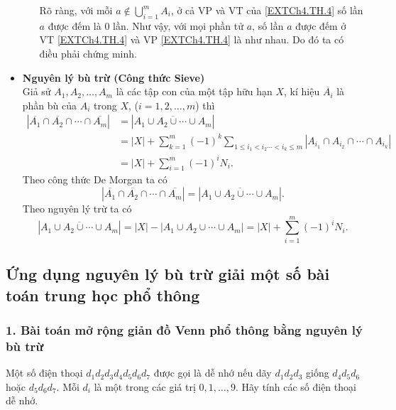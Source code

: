 \begin{itemize}
\begin{itemize}
			Rõ ràng, với mỗi $\displaystyle a\notin \bigcup \limits_{i=1}^m A_i$, ở cả VP và VT của \eqref{EXTCh4.TH.4} số lần $a$ được đếm là $0$ lần. Như vậy, với mọi phần tử $a$, số lần $a$ được đếm ở VT \eqref{EXTCh4.TH.4}  và VP \eqref{EXTCh4.TH.4} là như nhau. Do đó ta có điều phải chứng minh.
		\end{itemize}
		\item {\bf Nguyên lý bù trừ (Công thức Sieve)}\\
		Giả sử $A_1, A_2, \ldots, A_m$ là các tập con của một tập hữu hạn $X$, kí hiệu $\overline{A_i}$ là phần bù của $A_i$ trong $X$, ($i=1,2,\ldots,m$) thì 
		\begin{align*}
		\left| \overline{A_1} \cap \overline{A_2} \cap \cdots \cap \overline{A_m} \right| 
		& = \left| \overline{A_1 \cup A_2 \cup \cdots \cup A_m} \right| \\
		& = |X| + \sum \limits_{k=1}^m (-1)^k \sum \limits_{1\le i_1 < i_2 \cdots < i_k \le m} \left|A_{i_1} \cap A_{i_2} \cap \cdots \cap A_{i_k} \right|\\
		& = |X| + \sum \limits_{i=1}^m (-1)^i N_i.
		\end{align*}
		\cm Theo công thức De Morgan ta có 
		\[ \left| \overline{A_1} \cap \overline{A_2} \cap \cdots \cap \overline{A_m} \right| 
		= \left| \overline{A_1 \cup A_2 \cup \cdots \cup A_m} \right|. \]
		Theo nguyên lý trừ ta có
		\[ \left| \overline{A_1 \cup A_2 \cup \cdots \cup A_m} \right| = |X| - |A_1 \cup A_2 \cup \cdots \cup A_m| = |X| + \sum \limits_{i=1}^m (-1)^i N_i.\]
	\end{itemize}


\subsection{Ứng dụng nguyên lý bù trừ giải một số bài toán trung học phổ thông}

\subsubsection{1. Bài toán mở rộng giản đồ Venn phổ thông bằng nguyên lý bù trừ}
\begin{bt}%
	Một số điện thoại $d_1 d_2 d_3 d_4 d_5 d_6 d_7$ được gọi là dễ nhớ nếu dãy $d_1 d_2 d_3$ giống $d_4d_5d_6$ hoặc $d_5 d_6 d_7$. Mỗi $d_i$ là một trong các giá trị $0,1,\ldots,9$. Hãy tính các số điện thoại dễ nhớ.
\end{bt}

